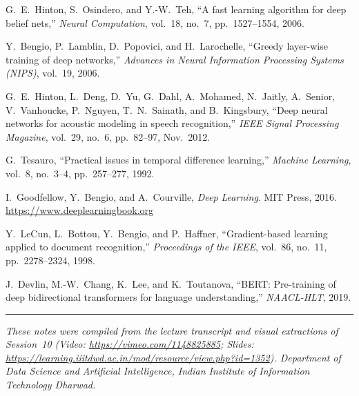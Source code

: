 \documentclass[12pt,a4paper]{article}
\begin{document}
\begin{enumerate}[leftmargin=*, label={[\arabic*]}]

  \item G.\ E.\ Hinton, S.\ Osindero, and Y.-W.\ Teh, ``A fast learning
        algorithm for deep belief nets,'' \textit{Neural Computation},
        vol.\ 18, no.\ 7, pp.\ 1527--1554, 2006.

  \item Y.\ Bengio, P.\ Lamblin, D.\ Popovici, and H.\ Larochelle,
        ``Greedy layer-wise training of deep networks,''
        \textit{Advances in Neural Information Processing Systems (NIPS)},
        vol.\ 19, 2006.

  \item G.\ E.\ Hinton, L.\ Deng, D.\ Yu, G.\ Dahl, A.\ Mohamed,
        N.\ Jaitly, A.\ Senior, V.\ Vanhoucke, P.\ Nguyen, T.\ N.\ Sainath,
        and B.\ Kingsbury,
        ``Deep neural networks for acoustic modeling in speech recognition,''
        \textit{IEEE Signal Processing Magazine}, vol.\ 29, no.\ 6,
        pp.\ 82--97, Nov.\ 2012.

  \item G.\ Tesauro, ``Practical issues in temporal difference learning,''
        \textit{Machine Learning}, vol.\ 8, no.\ 3--4, pp.\ 257--277, 1992.

  \item I.\ Goodfellow, Y.\ Bengio, and A.\ Courville,
        \textit{Deep Learning}. MIT Press, 2016.
        \url{https://www.deeplearningbook.org}

  \item Y.\ LeCun, L.\ Bottou, Y.\ Bengio, and P.\ Haffner,
        ``Gradient-based learning applied to document recognition,''
        \textit{Proceedings of the IEEE}, vol.\ 86, no.\ 11,
        pp.\ 2278--2324, 1998.

  \item J.\ Devlin, M.-W.\ Chang, K.\ Lee, and K.\ Toutanova,
        ``BERT: Pre-training of deep bidirectional transformers for
        language understanding,'' \textit{NAACL-HLT}, 2019.

\end{enumerate}

\vspace{2em}
\hrule
\vspace{0.5em}
\noindent\small\textit{These notes were compiled from the lecture transcript
and visual extractions of Session~10 (Video: \url{https://vimeo.com/1148825885};
Slides: \url{https://learning.iiitdwd.ac.in/mod/resource/view.php?id=1352}).
Department of Data Science and Artificial Intelligence,
Indian Institute of Information Technology Dharwad.}
\end{document}
